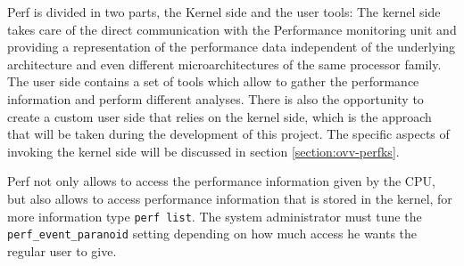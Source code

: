 Perf is divided in two parts, the Kernel side and the user tools: The kernel side takes care of the direct communication with the Performance monitoring unit and providing a representation of the performance data independent of the underlying architecture and even different microarchitectures of the same processor family. The user side contains a set of tools which allow to gather the performance information and perform different analyses. There is also the opportunity to create a custom user side that relies on the kernel side, which is the approach that will be taken during the development of this project. The specific aspects of invoking the kernel side will be discussed in section \ref{section:ovv-perfks}.

Perf not only allows to access the performance information given by the CPU, but also allows to access performance information that is stored in the kernel, for more information type \texttt{perf list}. The system administrator must tune the \texttt{perf\_event\_paranoid} setting depending on how much access he wants the regular user to give. 